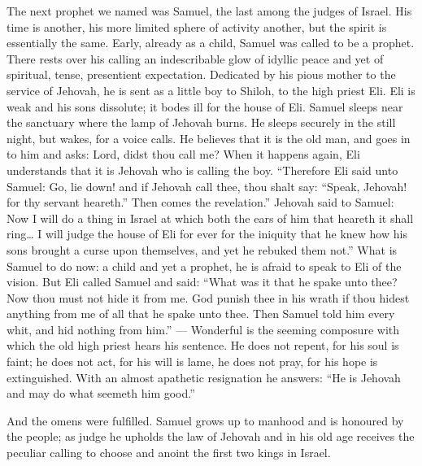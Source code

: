 \documentclass[12pt,a4paper,openany]{book}
\newcommand{\opage}[1]{\marginnote{\footnotesize\textit{[#1]}}}
\begin{document}
\setcounter{footnote}{0}%
\opage{31}The next prophet we named was Samuel, the
last among the judges of Israel. His time is another,
his more limited sphere of activity another, but
the spirit is essentially the same. Early, already as a
child, Samuel was called to be a prophet. There rests over
his calling an indescribable glow of idyllic peace
and yet of spiritual, tense, presentient expectation. Dedicated
by his pious mother to the service of Jehovah, he is sent
as a little boy to Shiloh, to the high priest Eli. Eli
is weak and his sons dissolute; it bodes ill for
the house of Eli. Samuel sleeps near the sanctuary where
the lamp of Jehovah burns. He sleeps securely in the still
night, but wakes, for a voice calls. He
believes that it is the old man, and goes in to him and
asks: Lord, didst thou call me? When it happens
again, Eli understands that it is Jehovah who is calling
the boy. ``Therefore Eli said unto Samuel: Go,
lie down! and if Jehovah call thee, thou shalt say:
``Speak, Jehovah! for thy servant heareth.'' Then comes the revelation.''
Jehovah said to Samuel: Now I will do
a thing in Israel at which both the ears of him
that heareth it shall ring\dots{} I will judge the house of Eli for ever
for the iniquity that he knew how
his sons brought a curse upon themselves, and yet he rebuked
them not.'' What is Samuel to do now: a child
and yet a prophet, he is afraid to speak to Eli of
the vision. But Eli called Samuel and said: ``What
was it that he spake unto thee? Now thou must not hide
it from me. God punish thee in his wrath if thou
hidest anything from me of all that he spake unto thee.
Then Samuel told him every whit, and hid
nothing from him.'' --- Wonderful is the seeming
\setcounter{footnote}{0}%
\opage{32}composure with which the old high priest hears his
sentence. He does not repent, for his soul is faint; he
does not act, for his will is lame, he does not pray,
for his hope is extinguished. With an almost apathetic
resignation he answers: ``He is Jehovah and may do
what seemeth him good.''

And the omens were fulfilled. Samuel grows up
to manhood and is honoured by the people; as judge he upholds
the law of Jehovah and in his old age receives the peculiar
calling to choose and anoint the first two kings in
Israel.
\end{document}

